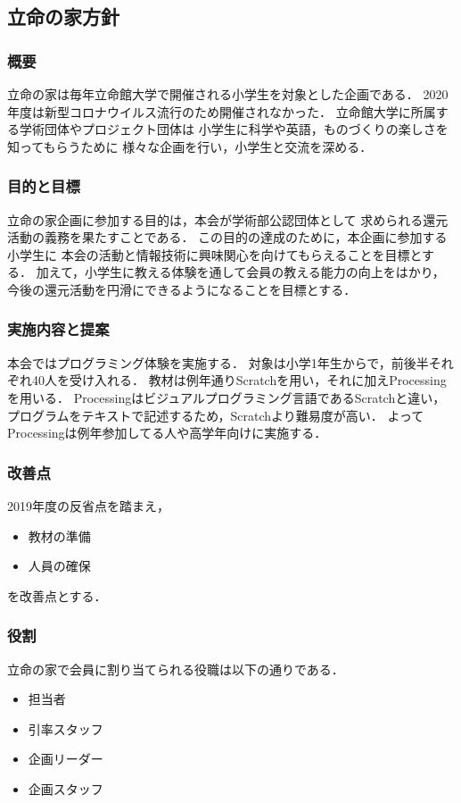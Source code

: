 \subsection*{立命の家方針}

\subsubsection*{概要}
立命の家は毎年立命館大学で開催される小学生を対象とした企画である．
2020年度は新型コロナウイルス流行のため開催されなかった．
立命館大学に所属する学術団体やプロジェクト団体は
小学生に科学や英語，ものづくりの楽しさを知ってもらうために
様々な企画を行い，小学生と交流を深める．

\subsubsection*{目的と目標}
立命の家企画に参加する目的は，本会が学術部公認団体として
求められる還元活動の義務を果たすことである．
この目的の達成のために，本企画に参加する小学生に
本会の活動と情報技術に興味関心を向けてもらえることを目標とする．
加えて，小学生に教える体験を通して会員の教える能力の向上をはかり，
今後の還元活動を円滑にできるようになることを目標とする．

\subsubsection*{実施内容と提案}
本会ではプログラミング体験を実施する．
対象は小学1年生からで，前後半それぞれ40人を受け入れる．
教材は例年通りScratchを用い，それに加えProcessingを用いる．
Processingはビジュアルプログラミング言語であるScratchと違い，
プログラムをテキストで記述するため，Scratchより難易度が高い．
よってProcessingは例年参加してる人や高学年向けに実施する．

\subsubsection*{改善点}
2019年度の反省点を踏まえ，
\begin{itemize}
  \item 教材の準備
  \item 人員の確保
\end{itemize}
を改善点とする．

\subsubsection*{役割}
立命の家で会員に割り当てられる役職は以下の通りである．
\begin{itemize}
  \item 担当者
  \item 引率スタッフ
  \item 企画リーダー
  \item 企画スタッフ
\end{itemize} 

